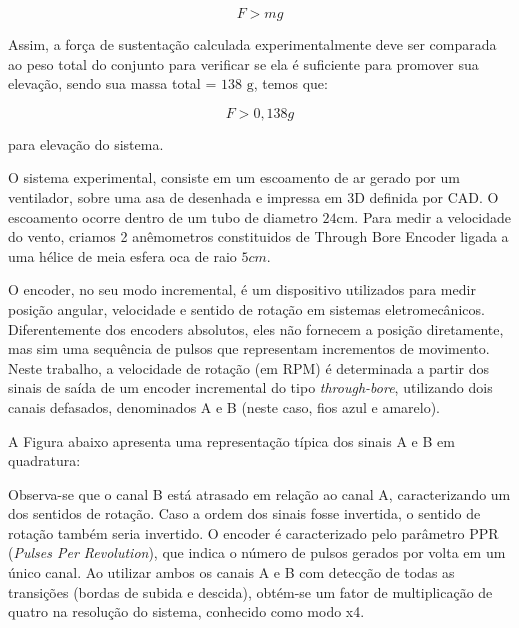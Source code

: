 \documentclass[12pt]{article}
\begin{document}
\begin{equation}
\textbf{$F > mg$}
\end{equation}

Assim, a força de sustentação calculada experimentalmente deve ser comparada ao peso total do conjunto para verificar se ela é suficiente para promover sua elevação, sendo sua massa total = $138\text{ g}$, temos que:

\begin{equation}
\textbf{$F > 0,138g$}
\end{equation}

para elevação do sistema.

O sistema experimental, consiste em um escoamento de ar gerado por um ventilador, sobre uma asa de desenhada e impressa em 3D definida por CAD. O escoamento ocorre dentro de um tubo de diametro $24\text{cm}$. Para medir a velocidade do vento, criamos 2 anêmometros constituidos de Through Bore Encoder ligada a uma hélice de meia esfera oca de raio $5cm$. 

O encoder, no seu modo incremental, é um dispositivo utilizados para medir posição angular, velocidade e sentido de rotação em sistemas eletromecânicos. Diferentemente dos encoders absolutos, eles não fornecem a posição diretamente, mas sim uma sequência de pulsos que representam incrementos de movimento. Neste trabalho, a velocidade de rotação (em RPM) é determinada a partir dos sinais de saída de um encoder incremental do tipo \textit{through-bore}, utilizando dois canais defasados, denominados A e B (neste caso, fios azul e amarelo).

A Figura abaixo apresenta uma representação típica dos sinais A e B em quadratura:
\begin{center}
\end{center}

Observa-se que o canal B está atrasado em relação ao canal A, caracterizando um dos sentidos de rotação. Caso a ordem dos sinais fosse invertida, o sentido de rotação também seria invertido.
O encoder é caracterizado pelo parâmetro PPR (\textit{Pulses Per Revolution}), que indica o número de pulsos gerados por volta em um único canal. Ao utilizar ambos os canais A e B com detecção de todas as transições (bordas de subida e descida), obtém-se um fator de multiplicação de quatro na resolução do sistema, conhecido como modo x4.
\end{document}
